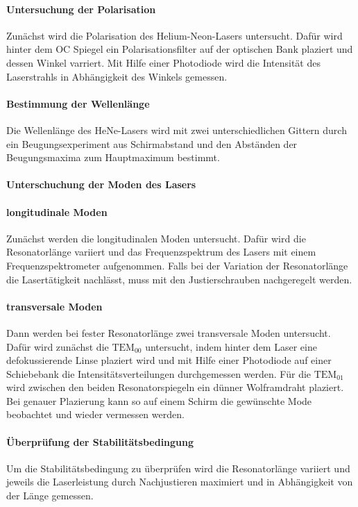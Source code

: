 \paragraph{ Untersuchung der Polarisation}
Zunächst wird die Polarisation des Helium-Neon-Lasers
untersucht. Dafür wird hinter dem OC Spiegel ein
Polarisationsfilter auf der optischen Bank
plaziert und dessen Winkel varriert. Mit Hilfe einer Photodiode wird
die Intensität des Laserstrahls in Abhängigkeit des Winkels gemessen.

\paragraph{Bestimmung der Wellenlänge}
Die Wellenlänge des HeNe-Lasers wird mit zwei unterschiedlichen
Gittern durch ein Beugungsexperiment aus Schirmabstand
und den Abständen der Beugungsmaxima zum Hauptmaximum bestimmt.

\paragraph{Unterschuchung der Moden des Lasers}
\paragraph{longitudinale Moden}
Zunächst werden die longitudinalen Moden untersucht. Dafür
wird die Resonatorlänge variiert und das Frequenzspektrum des Lasers
mit einem Frequenzspektrometer aufgenommen.
Falls bei der Variation der Resonatorlänge die Lasertätigkeit
nachlässt, muss mit den Justierschrauben nachgeregelt werden.

\paragraph{transversale Moden}
Dann werden bei fester Resonatorlänge zwei transversale Moden untersucht.
Dafür wird zunächst die $\text{TEM}_{00}$ untersucht, indem hinter dem
Laser eine defokussierende Linse plaziert wird und mit Hilfe einer
Photodiode auf einer Schiebebank die Intensitätsverteilungen
durchgemessen werden.
Für die $\text{TEM}_{01}$ wird zwischen den beiden Resonatorspiegeln
ein dünner Wolframdraht plaziert. Bei genauer Plazierung kann so auf
einem Schirm die gewünschte Mode beobachtet
und wieder vermessen werden.


\paragraph{Überprüfung der Stabilitätsbedingung}
Um die Stabilitätsbedingung zu überprüfen
wird die Resonatorlänge variiert und jeweils
die Laserleistung durch Nachjustieren maximiert und in Abhängigkeit von
der Länge gemessen.
